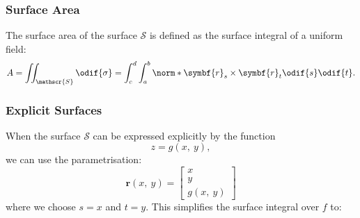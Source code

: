 \documentclass{article}
\begin{document}
\subsubsection{Surface Area}
The surface area of the surface \(\mathscr{S}\) is defined as the
surface integral of a uniform field:
\begin{equation*}
    A = \iint_{\mathscr{S}} \odif{\sigma} = \int_c^d \int_a^b \norm*{\symbf{r}_s \times \symbf{r}_t} \odif{s} \odif{t}.
\end{equation*}
\subsubsection{Explicit Surfaces}
When the surface \(\mathscr{S}\) can be expressed explicitly by the
function
\begin{equation*}
    z = g\left( x,\: y \right),
\end{equation*}
we can use the parametrisation:
\begin{equation*}
    \symbf{r}\left( x,\: y \right) =
    \begin{bmatrix}
        x \\
        y \\
        g\left( x,\: y \right)
    \end{bmatrix}
\end{equation*}
where we choose \(s = x\) and \(t = y\). This simplifies the surface
integral over \(f\) to:
\end{document}
